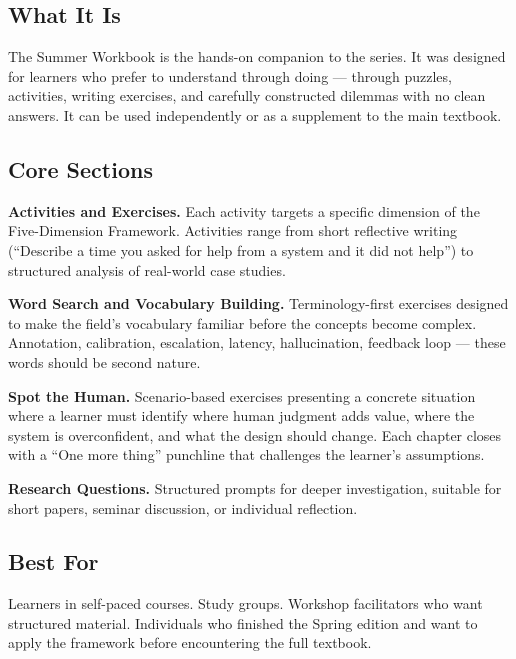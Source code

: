 \documentclass[12pt, a4paper]{article}
\begin{document}
\begin{tcolorbox}[editionbox=summergold, title=Summer Workbook Edition \textbullet\ Self-Paced Learner]

\subsection*{\color{charcoal} What It Is}

The Summer Workbook is the hands-on companion to the series. It was designed for learners who prefer to understand through doing — through puzzles, activities, writing exercises, and carefully constructed dilemmas with no clean answers. It can be used independently or as a supplement to the main textbook.

\subsection*{\color{charcoal} Core Sections}

\textbf{Activities and Exercises.} Each activity targets a specific dimension of the Five-Dimension Framework. Activities range from short reflective writing (``Describe a time you asked for help from a system and it did not help'') to structured analysis of real-world case studies.

\textbf{Word Search and Vocabulary Building.} Terminology-first exercises designed to make the field's vocabulary familiar before the concepts become complex. Annotation, calibration, escalation, latency, hallucination, feedback loop — these words should be second nature.

\textbf{Spot the Human.} Scenario-based exercises presenting a concrete situation where a learner must identify where human judgment adds value, where the system is overconfident, and what the design should change. Each chapter closes with a ``One more thing'' punchline that challenges the learner's assumptions.

\textbf{Research Questions.} Structured prompts for deeper investigation, suitable for short papers, seminar discussion, or individual reflection.

\subsection*{\color{charcoal} Best For}

Learners in self-paced courses. Study groups. Workshop facilitators who want structured material. Individuals who finished the Spring edition and want to apply the framework before encountering the full textbook.

\end{tcolorbox}
\end{document}
